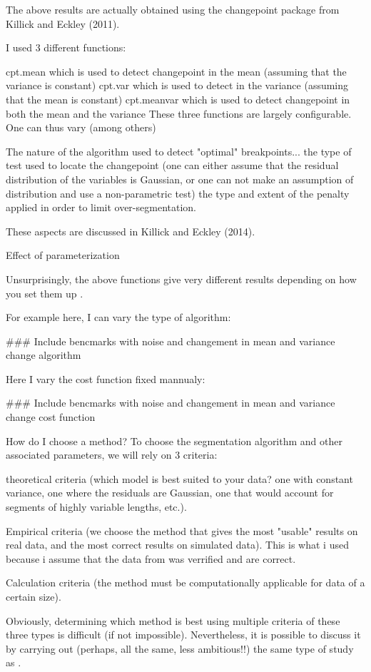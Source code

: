 \documentclass{article}
\begin{document}
The above results are actually obtained using the changepoint package from Killick and Eckley (2011).

I used 3 different functions:

cpt.mean which is used to detect changepoint in the mean (assuming that the variance is constant)
cpt.var which is used to detect  in the variance (assuming that the mean is constant)
cpt.meanvar which is used to detect changepoint in both the mean and the variance
These three functions are largely configurable. One can thus vary (among others)

The nature of the algorithm used to detect "optimal" breakpoints...
the type of test used to locate the changepoint (one can either assume that the residual distribution of the variables is Gaussian, or one can not make an assumption of distribution and use a non-parametric test)
the type and extent of the penalty applied in order to limit over-segmentation.

These aspects are discussed in Killick and Eckley (2014).

Effect of parameterization

Unsurprisingly, the above functions give very different results depending on how you set them up .

For example here, I can vary the type of algorithm:

\#\#\# Include bencmarks with noise and changement in mean and variance change algorithm

Here I vary the cost function fixed mannualy:

\#\#\# Include bencmarks with noise and changement in mean and variance change cost function

How do I choose a method?
To choose the segmentation algorithm and other associated parameters, we will rely on 3 criteria:

theoretical criteria (which model is best suited to your data? one with constant variance, one where the residuals are Gaussian, one that would account for segments of highly variable lengths, etc.).

Empirical criteria (we choose the method that gives the most "usable" results on real data, and the most correct results on simulated data). This is what i used because i assume that the data from \cite{barrett2017virtual} was verrified and are correct.

Calculation criteria (the method must be computationally applicable for data of a certain size).

Obviously, determining which method is best using multiple criteria of these three types is difficult (if not impossible). Nevertheless, it is possible to discuss it by carrying out (perhaps, all the same, less ambitious!!) the same type of study as \cite{leviandier2012comparison}.
\end{document}

